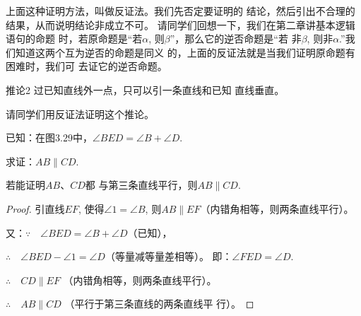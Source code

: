 上面这种证明方法，叫做反证法。我们先否定要证明的
结论，然后引出不合理的结果，从而说明结论非成立不可。
请同学们回想一下，我们在第二章讲基本逻辑语句的命题
时，若原命题是“若$\alpha$, 则$\beta$”，那么它的逆否命题是“若
非$\beta$, 则非$\alpha$.”我们知道这两个互为逆否的命题是同义
的，上面的反证法就是当我们证明原命题有困难时，我们可
去证它的逆否命题。

\begin{blk}
 {推论2} 过已知直线外一点，只可以引一条直线和已知
直线垂直。   
\end{blk}

请同学们用反证法证明这个推论。

\begin{example}
已知：在图3.29中，$\angle BED=\angle B+\angle D$.

求证：$AB\parallel CD$.
\end{example}

\begin{analyze}
    若能证明$AB$、$CD$都
与第三条直线平行，则$AB\parallel CD$.
\end{analyze}

\begin{proof}
    引直线$EF$, 使得$\angle 1=\angle B$, 则$AB\parallel EF$（内错角相等，则两条直线平行）。

又：$\because\quad \angle BED=\angle B+\angle D$（已知），

$\therefore\quad \angle BED-\angle 1=\angle D$（等量减等量差相等）。
即：$\angle FED=\angle D$.

$\therefore\quad CD\parallel EF$ （内错角相等，则两条直线平行）。

$\therefore\quad AB\parallel CD$ （平行于第三条直线的两条直线平
行）。
\end{proof}

\begin{figure}[htp]\centering
    \begin{minipage}[t]{0.48\textwidth}
    \centering
{}
    \caption{}
    \end{minipage}
    \begin{minipage}[t]{0.48\textwidth}
    \centering
    \caption{}
    \end{minipage}
    \end{figure}

